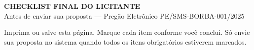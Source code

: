 \documentclass[12pt,a4paper]{article}
\newcommand{\editalRef}{PE/SMS-BORBA-001/2025}
\begin{document}
\clearpage
\begin{center}
  {\large\bfseries\color{navy}CHECKLIST FINAL DO LICITANTE}\\[4pt]
  {\normalsize Antes de enviar sua proposta --- Pregão Eletrônico \editalRef}
\end{center}

\vspace{0.3cm}
\begin{infobox}
\small
Imprima ou salve esta página. Marque cada item conforme você conclui.
Só envie sua proposta no sistema quando todos os itens obrigatórios
estiverem marcados.
\end{infobox}
\end{document}
